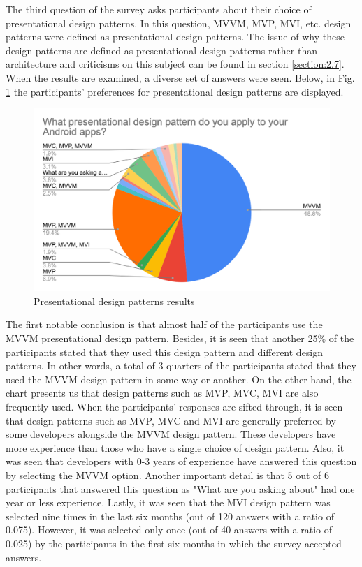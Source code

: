 The third question of the survey asks participants about their choice of presentational design patterns. In this question, MVVM, MVP, MVI, etc. design patterns were defined as presentational design patterns. The issue of why these design patterns are defined as presentational design patterns rather than architecture and criticisms on this subject can be found in section \ref{section:2.7}. When the results are  examined, a diverse set of answers were seen. Below, in Fig. \ref{fig:design_pattern} the participants' preferences for presentational design patterns are displayed.
\begin{figure}[ht!]
    \centering
    \includegraphics[scale=0.3]{figures/design_pattern.png}
    \caption{Presentational design patterns results}
    \label{fig:design_pattern}
\end{figure}
\FloatBarrier
The first notable conclusion is that almost half of the participants use the MVVM presentational design pattern. Besides, it is seen that another 25\% of the participants stated that they used this design pattern and different design patterns. In other words, a total of 3 quarters of the participants stated that they used the MVVM design pattern in some way or another. On the other hand, the chart presents us that design patterns such as MVP, MVC, MVI are also frequently used. When the participants' responses are sifted through, it is seen that design patterns such as MVP, MVC and MVI are generally preferred by some developers alongside the MVVM design pattern. These developers have more experience than those who have a single choice of design pattern. Also, it was seen that developers with 0-3 years of experience have answered this question by selecting the MVVM option. Another important detail is that 5 out of 6 participants that answered this question as "What are you asking about" had one year or less experience. Lastly, it was seen that the MVI design pattern was selected nine times in the last six months (out of 120 answers with a ratio of 0.075). However, it was selected only once (out of 40 answers with a ratio of 0.025) by the participants in the first six months in which the survey accepted answers.

